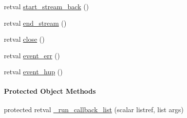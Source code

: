 \begin{Indent}
\begin{DoxyCompactItemize}
retval \hyperlink{class_d_jabberd_1_1_connection_a805d3da1fc71f45c7667c607f1ed7051}{start\-\_\-stream\-\_\-back} ()
\item 
retval \hyperlink{class_d_jabberd_1_1_connection_a5ee0b26f0c3c30404de8cba4744ad2ea}{end\-\_\-stream} ()
\item 
retval \hyperlink{class_d_jabberd_1_1_connection_af34e4d1557ea1071210432a2e4ef3871}{close} ()
\item 
retval \hyperlink{class_d_jabberd_1_1_connection_a8f56a7142e4cddabb01d281bfab7506f}{event\-\_\-err} ()
\item 
retval \hyperlink{class_d_jabberd_1_1_connection_a97cdf44a50aaddeb0b998d835acd3377}{event\-\_\-hup} ()
\end{DoxyCompactItemize}
\end{Indent}
\begin{Indent}\paragraph*{\-Protected \-Object \-Methods}
\begin{DoxyCompactItemize}
\item 
protected retval \hyperlink{class_d_jabberd_1_1_connection_ae54be92682b9a89db9513546df5a09c3}{\-\_\-run\-\_\-callback\-\_\-list} (scalar listref, list args)
\end{DoxyCompactItemize}
\end{Indent}


